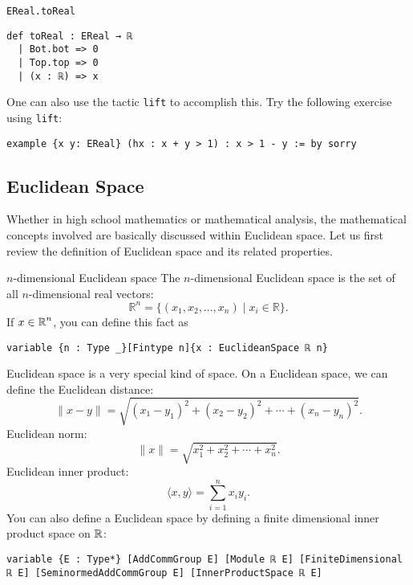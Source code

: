 \documentclass[a4paper]{article}
\begin{document}
\begin{dfn}{\texttt{EReal.toReal}}
\begin{lstlisting}[style = lean]
def toReal : EReal → ℝ
  | Bot.bot => 0
  | Top.top => 0
  | (x : ℝ) => x
\end{lstlisting}
\end{dfn}
One can also use the tactic \texttt{lift} to accomplish this. Try the following exercise using \texttt{lift}:
\begin{xmp}{}
\begin{lstlisting}[style = lean]
example {x y: EReal} (hx : x + y > 1) : x > 1 - y := by sorry
\end{lstlisting}
\end{xmp}

\subsection{Euclidean Space}

Whether in high school mathematics or mathematical analysis, the mathematical concepts involved are basically discussed within Euclidean space. Let us first review the definition of Euclidean space and its related properties.

\begin{dfn}{$n$-dimensional Euclidean space}
The $n$-dimensional Euclidean space is the set of all $n$-dimensional real vectors:
\begin{equation*}
\mathbb{R}^n = \{ (x_1, x_2, \ldots, x_n) \mid x_i \in \mathbb{R} \}.
\end{equation*}
If $x \in \operatorname{\mathbb{R}}^n$, you can define this fact as
\begin{lstlisting}[style = lean]
variable {n : Type _}[Fintype n]{x : EuclideanSpace ℝ n}
\end{lstlisting}
\end{dfn}

Euclidean space is a very special kind of space. On a Euclidean space, we can define the Euclidean distance:
\[
\| x-y \| = \sqrt{(x_1-y_1)^2 + (x_2-y_2)^2 + \cdots + (x_n-y_n)^2}.
\]
Euclidean norm:
\[
\| x \| = \sqrt{x_1^2 + x_2^2 + \cdots + x_n^2}.
\]
Euclidean inner product:
\begin{equation*}
    \langle x,y\rangle = \sum_{i=1}^n x_i y_i.
\end{equation*}
You can also define a Euclidean space by defining a finite dimensional inner product space on $\operatorname{\mathbb{R}}$:
\begin{xmp}{}
\begin{lstlisting}[style = lean]
variable {E : Type*} [AddCommGroup E] [Module ℝ E] [FiniteDimensional ℝ E] [SeminormedAddCommGroup E] [InnerProductSpace ℝ E]
\end{lstlisting}
\end{xmp}
\end{document}
